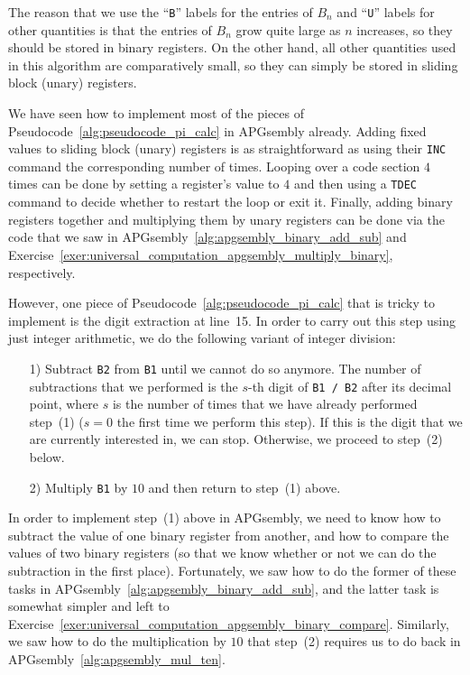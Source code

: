 The reason that we use the ``\texttt{B}'' labels for the entries of $B_n$ and ``\texttt{U}'' labels for other quantities is that the entries of $B_n$ grow quite large as $n$ increases, so they should be stored in binary registers. On the other hand, all other quantities used in this algorithm are comparatively small, so they can simply be stored in sliding block (unary) registers.

We have seen how to implement most of the pieces of Pseudocode~\ref{alg:pseudocode_pi_calc} in APGsembly already. Adding fixed values to sliding block (unary) registers is as straightforward as using their \texttt{INC} command the corresponding number of times. Looping over a code section $4$ times can be done by setting a register's value to $4$ and then using a \texttt{TDEC} command to decide whether to restart the loop or exit it. Finally, adding binary registers together and multiplying them by unary registers can be done via the code that we saw in APGsembly~\ref{alg:apgsembly_binary_add_sub} and Exercise~\ref{exer:universal_computation_apgsembly_multiply_binary}, respectively.

However, one piece of Pseudocode~\ref{alg:pseudocode_pi_calc} that is tricky to implement is the digit extraction at line~15. In order to carry out this step using just integer arithmetic, we do the following variant of integer division:\smallskip

\begin{enumerate}
	\item[1)] Subtract \texttt{B2} from \texttt{B1} until we cannot do so anymore. The number of subtractions that we performed is the $s$-th digit of \texttt{B1 / B2} after its decimal point, where $s$ is the number of times that we have already performed step~(1) ($s = 0$ the first time we perform this step). If this is the digit that we are currently interested in, we can stop. Otherwise, we proceed to step~(2) below.\smallskip
	
	\item[2)] Multiply \texttt{B1} by $10$ and then return to step~(1) above.\smallskip
\end{enumerate}

In order to implement step~(1) above in APGsembly, we need to know how to subtract the value of one binary register from another, and how to compare the values of two binary registers (so that we know whether or not we can do the subtraction in the first place). Fortunately, we saw how to do the former of these tasks in APGsembly~\ref{alg:apgsembly_binary_add_sub}, and the latter task is somewhat simpler and left to Exercise~\ref{exer:universal_computation_apgsembly_binary_compare}. Similarly, we saw how to do the multiplication by $10$ that step~(2) requires us to do back in APGsembly~\ref{alg:apgsembly_mul_ten}.

